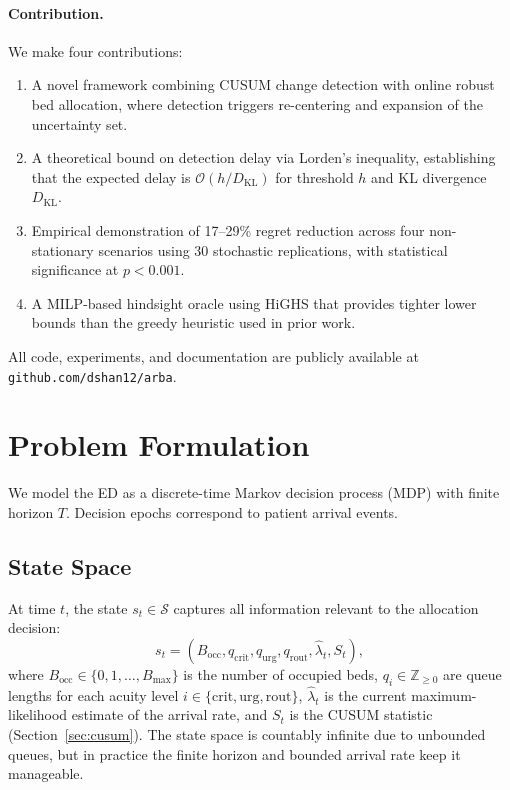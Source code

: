 \documentclass[11pt,twocolumn]{article}
\theoremstyle{plain}
\theoremstyle{definition}
\begin{document}
\paragraph{Contribution.} We make four contributions:
\begin{enumerate}
\item A novel framework combining CUSUM change detection with online robust bed allocation, where detection triggers re-centering and expansion of the uncertainty set.
\item A theoretical bound on detection delay via Lorden's inequality, establishing that the expected delay is $\mathcal{O}(h / D_{\text{KL}})$ for threshold $h$ and KL divergence $D_{\text{KL}}$.
\item Empirical demonstration of 17--29\% regret reduction across four non-stationary scenarios using 30 stochastic replications, with statistical significance at $p < 0.001$.
\item A MILP-based hindsight oracle using HiGHS that provides tighter lower bounds than the greedy heuristic used in prior work.
\end{enumerate}

All code, experiments, and documentation are publicly available at \texttt{github.com/dshan12/arba}.

\section{Problem Formulation}

We model the ED as a discrete-time Markov decision process (MDP) \cite{puterman1994markov} with finite horizon $T$. Decision epochs correspond to patient arrival events.

\subsection{State Space}

At time $t$, the state $s_t \in \mathcal{S}$ captures all information relevant to the allocation decision:
\begin{equation}
s_t = (B_{\text{occ}}, q_{\text{crit}}, q_{\text{urg}}, q_{\text{rout}}, \hat{\lambda}_t, S_t),
\label{eq:state}
\end{equation}
where $B_{\text{occ}} \in \{0, 1, \dots, B_{\max}\}$ is the number of occupied beds, $q_i \in \mathbb{Z}_{\ge 0}$ are queue lengths for each acuity level $i \in \{\text{crit}, \text{urg}, \text{rout}\}$, $\hat{\lambda}_t$ is the current maximum-likelihood estimate of the arrival rate, and $S_t$ is the CUSUM statistic (Section~\ref{sec:cusum}). The state space is countably infinite due to unbounded queues, but in practice the finite horizon and bounded arrival rate keep it manageable.
\end{document}
